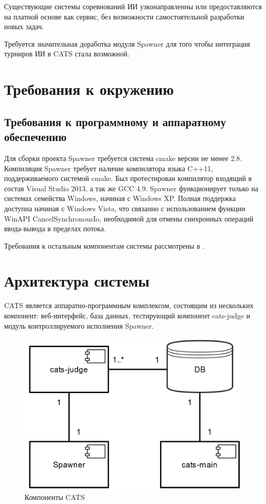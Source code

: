 \documentclass{imcs}
\begin{document}
Существующие системы соревнований ИИ узконаправленны или предоставляются на платной основе как сервис, без возможности самостоятельной разработки новых задач.

Требуется значительная доработка модуля Spawner для того чтобы интеграция турниров ИИ в CATS стала возможной.

\section{Требования к окружению}
\subsection{Требования к программному и аппаратному обеспечению}
Для сборки проекта Spawner требуется система cmake версии не менее 2.8. Компиляция Spawner требует наличие компилятора языка C++11, поддерживаемого системой cmake. Был протестирован компилятор входящий в состав Visual Studio 2013, а так же GCC 4.9. Spawner функционирует только на системах семейства Windows, начиная с Windows XP. Полная поддержка доступна начиная с Windows Vista, что связанно с использованием функции WinAPI CancelSynchronousIo, необходимой для отмены синхронных операций ввода-вывода в пределах потока.

Требования к остальным компонентам системы рассмотрены в \cite{rozhkov}.

\section{Архитектура системы}

CATS является аппаратно-программным комплексом, состоящим из нескольких компонент: веб-интерфейс, база данных, тестирующий компонент cats-judge и модуль контроллируемого исполнения Spawner.

\begin{figure}[htb]
\centering
\includegraphics[width=\textwidth,keepaspectratio]{./img/cats.png}
\caption{Компоненты CATS}
\label{cats}
\end{figure}
\end{document}

